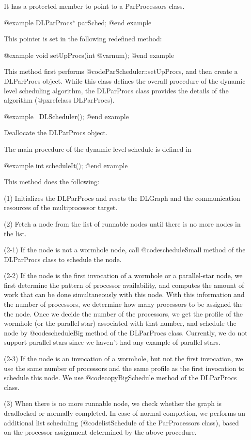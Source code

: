 It has a protected member to point to a ParProcessors class.

@example
DLParProcs* parSched;
@end example

This pointer is set in the following redefined method:

@example
void setUpProcs(int @var{num});
@end example

This method first performs @code{ParScheduler::setUpProcs}, and then
create a DLParProcs object. While this class defines the overall
procedure of the dynamic level scheduling algorithm, the DLParProcs class
provides the details of the algorithm (@pxref{class DLParProcs}). 

@example
~DLScheduler();
@end example

Deallocate the DLParProcs object.

The main procedure of the dynamic level schedule is defined in

@example
int scheduleIt();
@end example

This method does the following:

(1) Initializes the DLParProcs and resets the DLGraph and
the communication resources of the multiprocessor target.

(2) Fetch a node from the list of runnable nodes until there is no more nodes
in the list.

(2-1) If the node is not a wormhole node, call @code{scheduleSmall} method
of the DLParProcs class to schedule the node.

(2-2) If the node is the first invocation of a wormhole or a parallel-star
node, we first determine the pattern of processor availability, and computes
the amount of work that can be done simultaneously with this node. With
this information and the number of processors, we determine how many
processors to be assigned the the node. Once we decide the number of the
processors, we get the profile of the wormhole (or the parallel star)
associated with that number, and schedule the node by @code{scheduleBig}
method of the DLParProcs class. Currently, we do not support parallel-stars
since we haven't had any example of parallel-stars.

(2-3) If the node is an invocation of a wormhole, but not the first invocation,
we use the same number of processors and the same profile as the first
invocation to schedule this node. We use @code{copyBigSchedule} method of
the DLParProcs class. 

(3) When there is no more runnable node, we check whether the graph is
deadlocked or normally completed. In case of normal completion, we
performs an additional list scheduling (@code{listSchedule} of 
the ParProcessors class), based on the processor assignment determined
by the above procedure.


